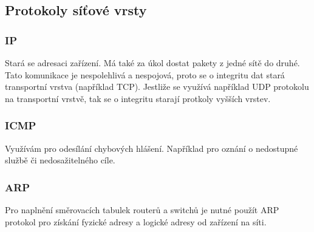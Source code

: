 \subsection{Protokoly síťové vrsty}
\subsubsection{IP}
Stará se adresaci zařízení.
Má také za úkol dostat pakety z jedné sítě do druhé.
Tato komunikace je nespolehlivá a nespojová, proto se o integritu dat stará transportní vrstva (například TCP).
Jestliže se využívá například UDP protokolu na transportní vrstvě, tak se o integritu starají protkoly vyšších vrstev.
\subsubsection{ICMP}
Využívám pro odesílání chybových hlášení.
Například pro oznání o nedostupné službě či nedosažitelného cíle.
\subsubsection{ARP}
Pro naplnění směrovacích tabulek routerů a switchů je nutné použít ARP protokol pro získání fyzické adresy a logické adresy od zařízení na síti.